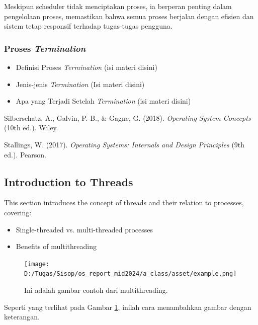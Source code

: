 \documentclass[12pt]{article}
\begin{document}
Meskipun scheduler tidak menciptakan proses, ia berperan penting dalam pengelolaan proses, memastikan bahwa semua proses berjalan dengan efisien dan sistem tetap responsif terhadap tugas-tugas pengguna.

\subsubsection{Proses \textit{Termination}}
\begin{itemize}
    \item Definisi Proses \textit{Termination}
     (isi materi disini)

    \item Jenis-jenis \textit{Termination}
    (Isi materi disini)

    \item Apa yang Terjadi Setelah \textit{Termination}
    (isi materi disini)
\end{itemize}

\begin{thebibliography}{99}

    Silberschatz, A., Galvin, P. B., \& Gagne, G. (2018). \textit{Operating System Concepts} (10th ed.). Wiley.

    Stallings, W. (2017). \textit{Operating Systems: Internals and Design Principles} (9th ed.). Pearson.
\end{thebibliography}

\subsection{Introduction to Threads}
This section introduces the concept of threads and their relation to processes, covering:
\begin{itemize}
    \item Single-threaded vs. multi-threaded processes
    \item Benefits of multithreading
\end{itemize}

\begin{figure}[h]
    \centering
    \texttt{[image: D:/Tugas/Sisop/os\_report\_mid2024/a\_class/asset/example.png]} %
    \caption{Ini adalah gambar contoh dari multithreading.}
    \label{fig:contoh_gambar}
\end{figure}


Seperti yang terlihat pada Gambar \ref{fig:contoh_gambar}, inilah cara menambahkan gambar dengan keterangan.
\end{document}
